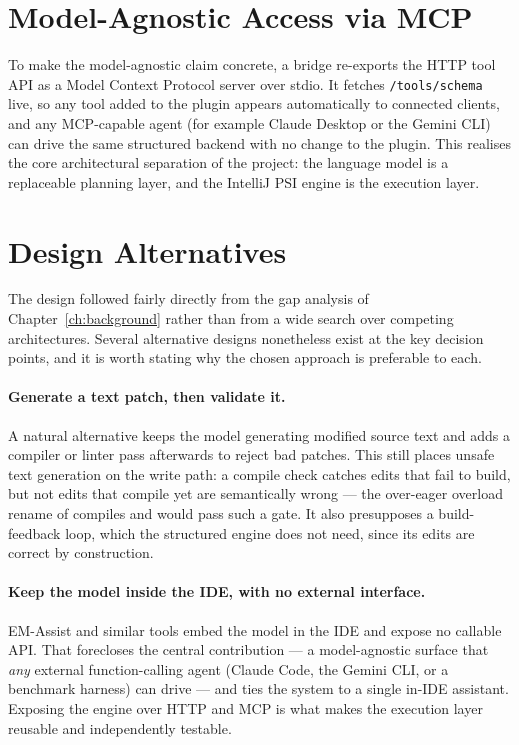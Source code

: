 \section{Model-Agnostic Access via MCP}
\label{sec:design-mcp}

To make the model-agnostic claim concrete, a bridge re-exports the HTTP tool API
as a Model Context Protocol server over stdio. It fetches \texttt{/tools/schema}
live, so any tool added to the plugin appears automatically to connected clients,
and any MCP-capable agent (for example Claude Desktop or the Gemini CLI) can drive
the same structured backend with no change to the plugin. This realises the core
architectural separation of the project: the language model is a replaceable
planning layer, and the IntelliJ PSI engine is the execution layer.

\section{Design Alternatives}
\label{sec:design-alternatives}
The design followed fairly directly from the gap analysis of
Chapter~\ref{ch:background} rather than from a wide search over competing
architectures. Several alternative designs nonetheless exist at the key decision
points, and it is worth stating why the chosen approach is preferable to each.

\paragraph{Generate a text patch, then validate it.} A natural alternative keeps the
model generating modified source text and adds a compiler or linter pass afterwards to
reject bad patches. This still places unsafe text generation on the write path: a
compile check catches edits that fail to build, but not edits that compile yet are
semantically wrong --- the over-eager overload rename of 
compiles and would pass such a gate. It also presupposes a build-feedback loop, which
the structured engine does not need, since its edits are correct by construction.

\paragraph{Keep the model inside the IDE, with no external interface.} EM-Assist and
similar tools embed the model in the IDE and expose no callable API. That forecloses
the central contribution --- a model-agnostic surface that \emph{any} external
function-calling agent (Claude Code, the Gemini CLI, or a benchmark harness) can drive
--- and ties the system to a single in-IDE assistant. Exposing the engine over HTTP and
MCP is what makes the execution layer reusable and independently testable.


